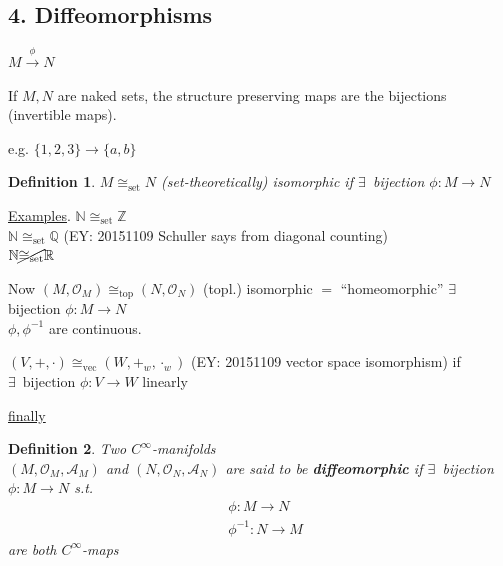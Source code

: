 \documentclass[10pt]{amsart}
\newtheorem{definition}{Definition}
\begin{document}
\begin{multicols*}{2}
\subsection{4. Diffeomorphisms}

$M \xrightarrow{ \phi } N$

If $M,N$ are naked sets, the structure preserving maps are the bijections (invertible maps).  

e.g. $\lbrace 1,2,3 \rbrace \to \lbrace a,b \rbrace$

\begin{definition}
	$M \cong_{\text{set}} N$ (set-theoretically) isomorphic if $\exists \, $ bijection $\phi : M \to N$
\end{definition}

\underline{Examples}.  $\mathbb{N} \cong_{\text{set}} \mathbb{Z}$ \\
$\mathbb{N} \cong_{\text{set}} \mathbb{Q}$  (EY: 20151109 Schuller says from diagonal counting)\\
$\mathbb{N} \cancel{\cong_{\text{set}}} \mathbb{R}$

Now $(M, \mathcal{O}_M) \cong_{\text{top}} (N,\mathcal{O}_N)$ (topl.) isomorphic $=$ ``homeomorphic'' $\exists \, $ bijection $\phi : M \to N$  \\
\phantom{ \quad \quad \, } $\phi, \phi^{-1}$ are continuous.  

$(V,+,\cdot) \cong_{\text{vec}} ( W,+_w,\cdot_w)$ (EY: 20151109 vector space isomorphism) if \\
$\exists \, \text{ bijection } \phi : V \to W$ linearly

\underline{finally}

\begin{definition}
	Two $C^{\infty}$-manifolds \\
	$(M,\mathcal{O}_M, \mathcal{A}_M)$ and $(N,\mathcal{O}_N, \mathcal{A}_N)$ are said to be \textbf{diffeomorphic} if $\exists \, $ bijection $\phi : M \to N$ s.t. 
	\[
	\begin{aligned} & \phi : M \to N \\
	& \phi^{-1} : N \to M \end{aligned}
	\]
	are both $C^{\infty}$-maps
	
	

\end{definition}
\end{multicols*}
\end{document}
